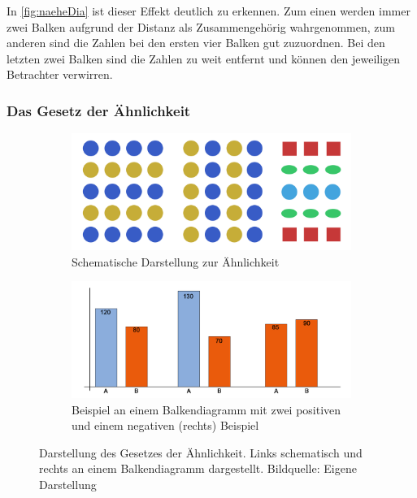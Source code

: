 In \ref{fig:naeheDia} ist dieser Effekt deutlich zu erkennen. 
Zum einen werden immer zwei Balken aufgrund der Distanz als Zusammengehörig wahrgenommen, zum anderen sind die Zahlen bei den ersten vier Balken gut zuzuordnen.
Bei den letzten zwei Balken sind die Zahlen zu weit entfernt und können den jeweiligen Betrachter verwirren.


\subsubsection{Das Gesetz der Ähnlichkeit}
\label{subsub:ähnlich}
\begin{figure}[ht]
\begin{subfigure}{.5\linewidth}
  \centering
  \includegraphics[width=.95\linewidth]{img/gAehnlich}  
  \caption{Schematische Darstellung zur Ähnlichkeit}
  \label{fig:aehnlichSchema}
\end{subfigure}
\begin{subfigure}{.5\linewidth}
  \centering
  \includegraphics[width=.95\linewidth]{img/gAehnlichDia}  
  \caption{Beispiel an einem Balkendiagramm mit zwei positiven und einem negativen (rechts) Beispiel}
  \label{fig:aehnlichDia}
\end{subfigure}
\caption[Gesetz der Ähnlichkeit]{Darstellung des Gesetzes der Ähnlichkeit. Links schematisch und rechts an einem Balkendiagramm dargestellt. Bildquelle: Eigene Darstellung}
\label{fig:aehnlich}
\end{figure}


